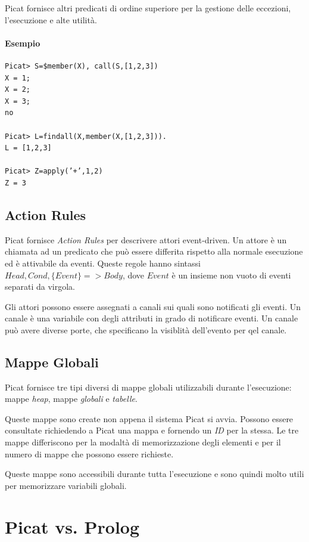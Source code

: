 \documentclass[12pt,a4paper,openright]{book} %
\begin{document}
Picat fornisce altri predicati di ordine superiore per la gestione
delle eccezioni, l'esecuzione e alte utilità.

\paragraph{Esempio}
\begin{verbatim}
Picat> S=$member(X), call(S,[1,2,3])
X = 1;
X = 2;
X = 3;
no

Picat> L=findall(X,member(X,[1,2,3])).
L = [1,2,3]

Picat> Z=apply(’+’,1,2)
Z = 3
\end{verbatim}

\subsection{Action Rules}
\label{subsec:picat_advanced_actionrules}

Picat fornisce \emph{Action Rules} per descrivere attori
event-driven. Un attore è un chiamata ad un predicato che può essere
differita rispetto alla normale esecuzione ed è attivabile da
eventi. Queste regole hanno sintassi $Head, Cond, \{Event\} => Body$,
dove $Event$ è un insieme non vuoto di eventi separati da virgola.

Gli attori possono essere assegnati a canali sui quali sono notificati
gli eventi. Un canale è una variabile con degli attributi in grado di
notificare eventi. Un canale può avere diverse porte, che specificano
la visiblità dell'evento per qel canale.

\subsection{Mappe Globali}
\label{subsec:picat_advanced_globalmaps}

Picat fornisce tre tipi diversi di mappe globali utilizzabili durante
l'esecuzione: mappe \emph{heap}, mappe \emph{globali} e
\emph{tabelle}.

Queste mappe sono create non appena il sistema Picat si avvia. Possono
essere consultate richiedendo a Picat una mappa e fornendo un
\emph{ID} per la stessa. Le tre mappe differiscono per la modaltà di
memorizzazione degli elementi e per il numero di mappe che possono
essere richieste.

Queste mappe sono accessibili durante tutta l'esecuzione e sono quindi
molto utili per memorizzare variabili globali.

\section{Picat vs. Prolog}
\label{sec:picat_picatvsprolog}
\end{document}
